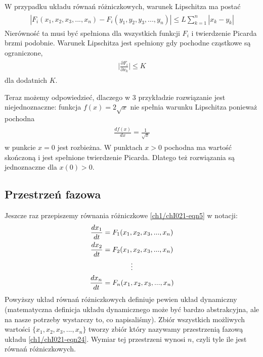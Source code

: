 \documentclass[a4paper,12pt,polish]{sphinxmanual}
\begin{document}
W przypadku układu równań różniczkowych, warunek Lipschitza ma postać
\label{ch1/chI021:equation-eqn18}\begin{gather}
\begin{split}|F_i(x_1, x_2, x_3, ..., x_n) - F_i(y_1, y_2, y_3, ..., y_n)| \le L  \sum_{k=1}^n|x_k-y_k|\end{split}\label{ch1/chI021-eqn18}
\end{gather}
Nierówność ta musi  być spełniona dla wszystkich funkcji $F_i$ i twierdzenie Picarda brzmi podobnie. Warunek Lipschitza jest spełniony gdy pochodne cząstkowe są ograniczone,
\label{ch1/chI021:equation-eqn19}\begin{gather}
\begin{split}\lvert\frac{\partial F_i}{\partial x_k}\rvert \le K\end{split}\label{ch1/chI021-eqn19}
\end{gather}
dla dodatnich $K$.

Teraz możemy odpowiedzieć, dlaczego w 3 przykładzie rozwiązanie jest niejednoznaczne: funkcja $f(x) = 2\sqrt x$ nie spełnia warunku Lipschitza ponieważ pochodna
\label{ch1/chI021:equation-eqn20}\begin{gather}
\begin{split}\frac{df(x)}{dx} = \frac{1}{\sqrt x}\end{split}\label{ch1/chI021-eqn20}
\end{gather}
w punkcie $x=0$ jest rozbieżna. W punktach $x>0$  pochodna ma wartość skończoną i jest spełnione twierdzenie Picarda. Dlatego też  rozwiązania są jednoznaczne dla $x(0) > 0$.


\subsection{Przestrzeń fazowa}
\label{ch1/chI021:przestrzen-fazowa}
Jeszcze raz przepiszemy równania różniczkowe   \eqref{ch1/chI021-eqn5}  w  notacji:
\label{ch1/chI021:equation-eqn21}\begin{gather}
\begin{split}\frac{dx_1}{dt} = F_1(x_1, x_2, x_3, ..., x_n)\end{split}\label{ch1/chI021-eqn21}\\\begin{split}\frac{dx_2}{dt} = F_2(x_1, x_2, x_3, ..., x_n)\end{split}\notag\\\begin{split}\vdots\end{split}\notag\\\begin{split}\frac{dx_n}{dt} = F_n(x_1, x_2, x_3, ..., x_n)\end{split}\notag
\end{gather}
Powyższy układ równań różniczkowych  definiuje pewien układ dynamiczny (matematyczna definicja układu dynamicznego może być bardzo abstrakcyjna, ale na nasze potrzeby wystarczy to, co napisaliśmy).  Zbiór wszystkich możliwych wartości $\{x_1, x_2, x_3, ..., x_n\}$ tworzy zbiór który nazywamy przestrzenią fazową układu \eqref{ch1/chI021-eqn24}. Wymiar tej przestrzeni wynosi $n$, czyli tyle ile jest równań różniczkowych.
\end{document}

